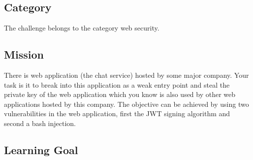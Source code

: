 \documentclass[12pt,a4paper]{article}
\begin{document}
\subsection{Category}

The challenge belongs to the category web security. %
\subsection{Mission}

There is web application (the chat service) hosted by some major company. Your task is it to break into this application as a weak entry point and steal the private key of the web application which you know is also used by other web applications hosted by this company. The objective can be achieved by using two vulnerabilities in the web application, first the JWT signing algorithm and second a bash injection.

\subsection{Learning Goal}
\end{document}
